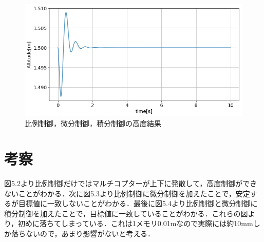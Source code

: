 \begin{enumerate}
\begin{figure}[htbp]
  \begin{center}
   \includegraphics[width=150mm]{img/PIDbest.jpg}
    \end{center}
  \caption{比例制御，微分制御，積分制御の高度結果}
 \label{fig:ensyu3tex}
\end{figure}

\end{enumerate}


\chapter{考察}
図5.2より比例制御だけではマルチコプターが上下に発散して，高度制御ができないことがわかる．次に図5.3より比例制御に微分制御を加えたことで，安定するが目標値に一致しないことがわかる．最後に図5.4より比例制御と微分制御に積分制御を加えたことで，目標値に一致していることがわかる．これらの図より，初めに落ちてしまっている．これは1メモリ0.01mなので実際には約10mmしか落ちないので，あまり影響がないと考える．